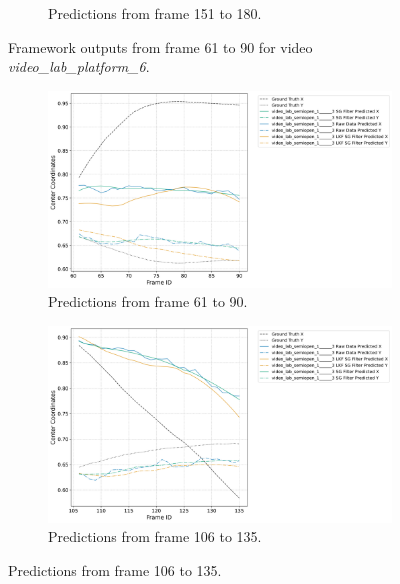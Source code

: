 \documentclass[12pt,oneside]{book} %
\begin{document}
\begin{figure}[H]
\begin{subfigure}[t]{0.8\textwidth}
        \caption{Predictions from frame 151 to 180.}
        \label{fig:framework-video_lab_platform_6-3}
    \end{subfigure}
    \caption{Framework outputs from frame 61 to 90 for video \textit{video\_lab\_platform\_6}.}
    \label{fig:framework-video_lab_platform_6}
\end{figure}

\begin{figure}[H]
    \centering
    \begin{subfigure}[t]{0.8\textwidth}
        \includegraphics[width=\textwidth]{figures/video_lab_semiopen_1______3_Group_1_Trajectories.png}
        \caption{Predictions from frame 61 to 90.}
        \label{fig:framework-video_lab_semiopen_1_3-1}
    \end{subfigure}
    \hfill
    \begin{subfigure}[t]{0.8\textwidth}
        \includegraphics[width=\textwidth]{figures/video_lab_semiopen_1______3_Group_2_Trajectories.png}
        \caption{Predictions from frame 106 to 135.}
        \label{fig:framework-video_lab_semiopen_1_3-2}
    \end{subfigure}

\end{figure}
\end{document}
